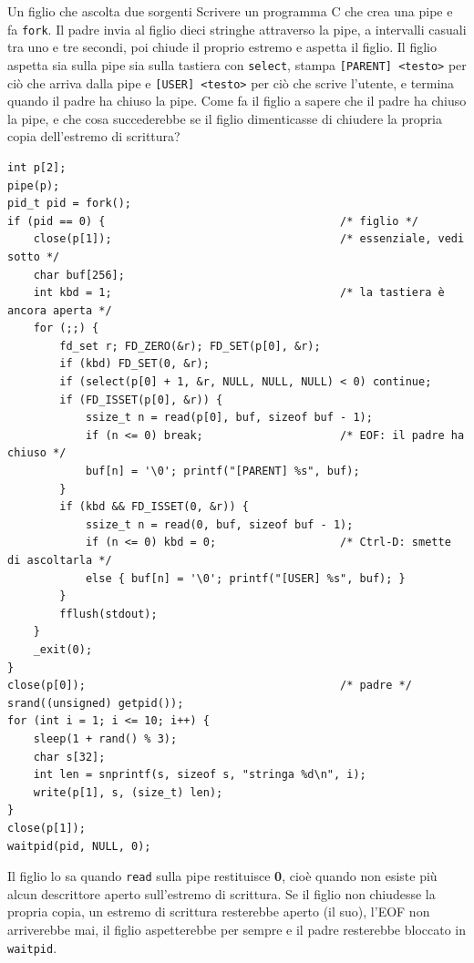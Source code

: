 \begin{esercizio}{Un figlio che ascolta due sorgenti}
Scrivere un programma C che crea una pipe e fa \texttt{fork}. Il padre invia al figlio dieci stringhe attraverso la pipe, a intervalli
casuali tra uno e tre secondi, poi chiude il proprio estremo e aspetta il figlio. Il figlio aspetta sia sulla pipe sia sulla tastiera con
\texttt{select}, stampa \texttt{[PARENT] <testo>} per ciò che arriva dalla pipe e \texttt{[USER] <testo>} per ciò che scrive l'utente, e
termina quando il padre ha chiuso la pipe. Come fa il figlio a sapere che il padre ha chiuso la pipe, e che cosa succederebbe se il figlio
dimenticasse di chiudere la propria copia dell'estremo di scrittura?

\svolgimento
\begin{lstlisting}[language={[POSIX]C}]
int p[2];
pipe(p);
pid_t pid = fork();
if (pid == 0) {                                    /* figlio */
    close(p[1]);                                   /* essenziale, vedi sotto */
    char buf[256];
    int kbd = 1;                                   /* la tastiera è ancora aperta */
    for (;;) {
        fd_set r; FD_ZERO(&r); FD_SET(p[0], &r);
        if (kbd) FD_SET(0, &r);
        if (select(p[0] + 1, &r, NULL, NULL, NULL) < 0) continue;
        if (FD_ISSET(p[0], &r)) {
            ssize_t n = read(p[0], buf, sizeof buf - 1);
            if (n <= 0) break;                     /* EOF: il padre ha chiuso */
            buf[n] = '\0'; printf("[PARENT] %s", buf);
        }
        if (kbd && FD_ISSET(0, &r)) {
            ssize_t n = read(0, buf, sizeof buf - 1);
            if (n <= 0) kbd = 0;                   /* Ctrl-D: smette di ascoltarla */
            else { buf[n] = '\0'; printf("[USER] %s", buf); }
        }
        fflush(stdout);
    }
    _exit(0);
}
close(p[0]);                                       /* padre */
srand((unsigned) getpid());
for (int i = 1; i <= 10; i++) {
    sleep(1 + rand() % 3);
    char s[32];
    int len = snprintf(s, sizeof s, "stringa %d\n", i);
    write(p[1], s, (size_t) len);
}
close(p[1]);
waitpid(pid, NULL, 0);
\end{lstlisting}
Il figlio lo sa quando \texttt{read} sulla pipe restituisce \textbf{0}, cioè quando non esiste più alcun descrittore aperto
sull'estremo di scrittura. Se il figlio non chiudesse la propria copia, un estremo di scrittura resterebbe aperto (il suo), l'EOF non
arriverebbe mai, il figlio aspetterebbe per sempre e il padre resterebbe bloccato in \texttt{waitpid}.
\end{esercizio}

